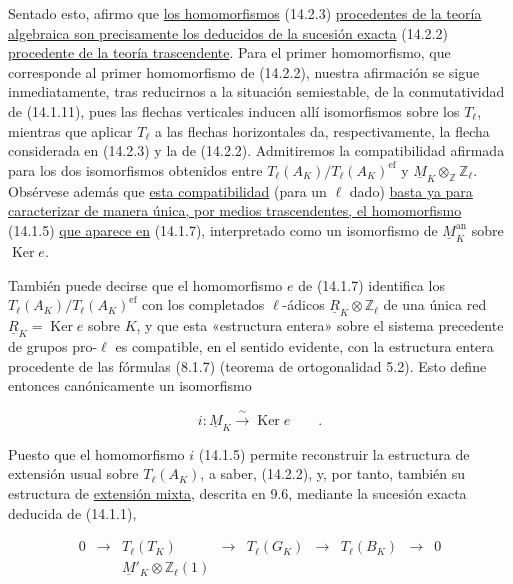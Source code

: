 \noindent
Sentado esto, afirmo que \underline{los homomorfismos} (14.2.3)
\underline{procedentes de la teoría algebraica son precisamente los
deducidos de la sucesión exacta} (14.2.2) \underline{procedente de la
teoría trascendente}. Para el primer homomorfismo, que corresponde al
primer homomorfismo de (14.2.2), nuestra afirmación se sigue
inmediatamente, tras reducirnos a la situación semiestable, de la
conmutatividad de (14.1.11), pues las flechas verticales inducen allí
isomorfismos sobre los $T_\ell$, mientras que aplicar $T_\ell$ a las
flechas horizontales da, respectivamente, la flecha considerada en
(14.2.3) y la de (14.2.2). Admitiremos la compatibilidad afirmada para
los dos isomorfismos obtenidos entre
$T_\ell(A_K)/T_\ell(A_K)^{\mathrm{ef}}$ y
$\underline M_K\otimes_{\mathbb Z}\mathbb Z_\ell$. Obsérvese además
que \underline{esta compatibilidad} (para un $\ell$ dado)
\underline{basta ya para caracterizar de manera única, por medios
trascendentes, el homomorfismo} (14.1.5) \underline{que aparece en}
(14.1.7), interpretado como un isomorfismo de
$\underline M_K^{\mathrm{an}}$ sobre $\operatorname{Ker}e$.

También puede decirse que el homomorfismo $e$ de (14.1.7) identifica
los $T_\ell(A_K)/T_\ell(A_K)^{\mathrm{ef}}$ con los completados
$\ell$-ádicos $\underline R_K\otimes\mathbb Z_\ell$ de una única red
$\underline R_K=\operatorname{Ker}e$ sobre $K$, y que esta «estructura
entera» sobre el sistema precedente de grupos pro-$\ell$ es compatible,
en el sentido evidente, con la estructura entera procedente de las
fórmulas (8.1.7) (teorema de ortogonalidad 5.2). Esto define entonces
canónicamente un isomorfismo

\begin{equation*}
 i:\underline M_K\xrightarrow{\ \sim\ }\operatorname{Ker}e
 \qquad .
\end{equation*}

Puesto que el homomorfismo $i$ (14.1.5) permite reconstruir la
estructura de extensión usual sobre $T_\ell(A_K)$, a saber, (14.2.2),
y, por tanto, también su estructura de \underline{extensión mixta},
descrita en 9.6, mediante la sucesión exacta deducida de (14.1.1),

\begin{equation*}
\begin{array}{ccccccccc}
0&\longrightarrow&T_\ell(T_K)&\longrightarrow&T_\ell(G_K)
 &\longrightarrow&T_\ell(B_K)&\longrightarrow&0\\[5ex]
 &&\underline M'_K\otimes\mathbb Z_\ell(1)&&&&&&
\end{array}
\end{equation*}

